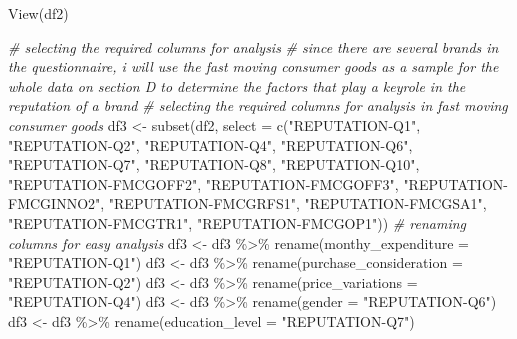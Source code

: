 \documentclass[
]{article}
\newenvironment{Shaded}{\begin{snugshade}}{\end{snugshade}}
\newcommand{\AttributeTok}[1]{\textcolor[rgb]{0.77,0.63,0.00}{#1}}
\newcommand{\CommentTok}[1]{\textcolor[rgb]{0.56,0.35,0.01}{\textit{#1}}}
\newcommand{\FunctionTok}[1]{\textcolor[rgb]{0.00,0.00,0.00}{#1}}
\newcommand{\NormalTok}[1]{#1}
\newcommand{\OtherTok}[1]{\textcolor[rgb]{0.56,0.35,0.01}{#1}}
\newcommand{\SpecialCharTok}[1]{\textcolor[rgb]{0.00,0.00,0.00}{#1}}
\newcommand{\StringTok}[1]{\textcolor[rgb]{0.31,0.60,0.02}{#1}}
\begin{document}
\begin{Shaded}
\begin{Highlighting}[]
\FunctionTok{View}\NormalTok{(df2)}
\end{Highlighting}
\end{Shaded}

\begin{Shaded}
\begin{Highlighting}[]
\CommentTok{\# selecting the required columns for analysis }
\CommentTok{\# since there are several brands in the questionnaire, i will use the fast moving consumer goods as a sample for the whole data on section D to determine the factors that play a keyrole in the reputation of a brand}
\CommentTok{\# selecting the required columns for analysis in fast moving consumer goods}
\NormalTok{df3 }\OtherTok{\textless{}{-}} \FunctionTok{subset}\NormalTok{(df2, }\AttributeTok{select =} \FunctionTok{c}\NormalTok{(}\StringTok{"REPUTATION{-}Q1"}\NormalTok{, }\StringTok{"REPUTATION{-}Q2"}\NormalTok{, }\StringTok{"REPUTATION{-}Q4"}\NormalTok{, }\StringTok{"REPUTATION{-}Q6"}\NormalTok{, }\StringTok{"REPUTATION{-}Q7"}\NormalTok{, }\StringTok{"REPUTATION{-}Q8"}\NormalTok{, }\StringTok{"REPUTATION{-}Q10"}\NormalTok{, }\StringTok{"REPUTATION{-}FMCGOFF2"}\NormalTok{, }\StringTok{"REPUTATION{-}FMCGOFF3"}\NormalTok{, }\StringTok{"REPUTATION{-}FMCGINNO2"}\NormalTok{,  }\StringTok{"REPUTATION{-}FMCGRFS1"}\NormalTok{,  }\StringTok{"REPUTATION{-}FMCGSA1"}\NormalTok{, }\StringTok{"REPUTATION{-}FMCGTR1"}\NormalTok{, }\StringTok{"REPUTATION{-}FMCGOP1"}\NormalTok{))}
\CommentTok{\# renaming columns for easy analysis}
\NormalTok{df3 }\OtherTok{\textless{}{-}}\NormalTok{ df3 }\SpecialCharTok{\%\textgreater{}\%} \FunctionTok{rename}\NormalTok{(}\AttributeTok{monthy\_expenditure =} \StringTok{"REPUTATION{-}Q1"}\NormalTok{)}
\NormalTok{df3 }\OtherTok{\textless{}{-}}\NormalTok{ df3 }\SpecialCharTok{\%\textgreater{}\%} \FunctionTok{rename}\NormalTok{(}\AttributeTok{purchase\_consideration =} \StringTok{"REPUTATION{-}Q2"}\NormalTok{)}
\NormalTok{df3 }\OtherTok{\textless{}{-}}\NormalTok{ df3 }\SpecialCharTok{\%\textgreater{}\%} \FunctionTok{rename}\NormalTok{(}\AttributeTok{price\_variations =} \StringTok{"REPUTATION{-}Q4"}\NormalTok{)}
\NormalTok{df3 }\OtherTok{\textless{}{-}}\NormalTok{ df3 }\SpecialCharTok{\%\textgreater{}\%} \FunctionTok{rename}\NormalTok{(}\AttributeTok{gender =} \StringTok{"REPUTATION{-}Q6"}\NormalTok{)}
\NormalTok{df3 }\OtherTok{\textless{}{-}}\NormalTok{ df3 }\SpecialCharTok{\%\textgreater{}\%} \FunctionTok{rename}\NormalTok{(}\AttributeTok{education\_level =} \StringTok{"REPUTATION{-}Q7"}\NormalTok{)}

\end{Highlighting}
\end{Shaded}
\end{document}
